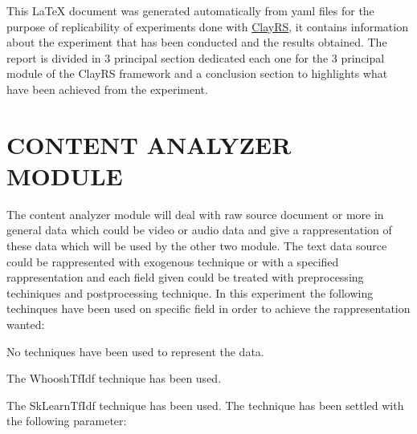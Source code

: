 \documentclass[11pt]{article}
\begin{document}
\maketitle
This \LaTeX{} document was generated automatically from yaml files for the purpose of replicability of experiments done with
\href{https://github.com/swapUniba/ClayRS}{ClayRS},
it contains information about the experiment that has been conducted and the results obtained.
The report is divided in 3 principal section dedicated each one for the 3 principal module of the ClayRS framework
and a conclusion section to highlights what have been achieved from the experiment.

\hfill\break

\section{CONTENT ANALYZER MODULE}\label{sec:ca}
The content analyzer module will deal with raw source document or more in general data which could be
video or audio data and give a rappresentation of these data which will be used by the other two module.
The text data source could be rappresented with exogenous technique or with a specified rappresentation
and each field given could be treated with preprocessing techiniques and postprocessing technique. In
this experiment the following techinques have been used on specific field in order to achieve the
rappresentation wanted:

\hfill\break


No techniques have been used to represent the data.

The WhooshTfIdf technique has been used.

The SkLearnTfIdf technique has been used.
The technique has been settled with the following parameter:
\end{document}

